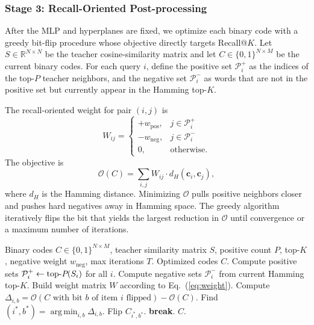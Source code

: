 \documentclass[11pt,a4paper]{article}
\DeclareMathOperator*{\argmin}{arg\,min}
\begin{document}
\subsubsection{Stage 3: Recall-Oriented Post-processing}

After the MLP and hyperplanes are fixed, we optimize each binary code with a greedy bit-flip procedure whose objective directly targets Recall@$K$. Let $S \in \mathbb{R}^{N \times N}$ be the teacher cosine-similarity matrix and let $C \in \{0,1\}^{N \times M}$ be the current binary codes. For each query $i$, define the positive set $\mathcal{P}_i^+$ as the indices of the top-$P$ teacher neighbors, and the negative set $\mathcal{P}_i^-$ as words that are not in the positive set but currently appear in the Hamming top-$K$.

The recall-oriented weight for pair $(i,j)$ is
\begin{equation}
\label{eq:weight}
    W_{ij} =
    \begin{cases}
        +w_{\text{pos}}, & j \in \mathcal{P}_i^+ \\
        -w_{\text{neg}}, & j \in \mathcal{P}_i^- \\
        0, & \text{otherwise}.
\end{cases}
\end{equation}
The objective is
\begin{equation}
\label{eq:objective}
    \mathcal{O}(C) = \sum_{i,j} W_{ij} \cdot d_H(\mathbf{c}_i, \mathbf{c}_j),
\end{equation}
where $d_H$ is the Hamming distance. Minimizing $\mathcal{O}$ pulls positive neighbors closer and pushes hard negatives away in Hamming space. The greedy algorithm iteratively flips the bit that yields the largest reduction in $\mathcal{O}$ until convergence or a maximum number of iterations.

\begin{algorithm}[htbp]
\caption{Recall-oriented greedy bit-flip optimization.}
\label{alg:postprocess}
\begin{algorithmic}[1]
\Require Binary codes $C \in \{0,1\}^{N \times M}$, teacher similarity matrix $S$, positive count $P$, top-$K$, negative weight $w_{\text{neg}}$, max iterations $T$.
\Ensure Optimized codes $C$.
\State Compute positive sets $\mathcal{P}_i^+ \leftarrow \operatorname{top-\emph{P}}(S_i)$ for all $i$.
    \State Compute negative sets $\mathcal{P}_i^-$ from current Hamming top-$K$.
    \State Build weight matrix $W$ according to Eq.~(\ref{eq:weight}).
    \State Compute $\Delta_{i,b} = \mathcal{O}(C \text{ with bit } b \text{ of item } i \text{ flipped}) - \mathcal{O}(C)$.
    \State Find $(i^*, b^*) = \argmin_{i,b} \Delta_{i,b}$.
        \State Flip $C_{i^*, b^*}$.
    \Else
        \State \textbf{break}.
    \EndIf
\EndFor
\State \Return $C$.
\end{algorithmic}
\end{algorithm}
\end{document}
